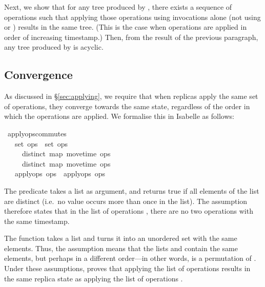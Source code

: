 \documentclass[sigplan,anonymous]{acmart}
\renewenvironment{isabelle}{%
  \medbreak\noindent%
  \renewcommand{\isanewline}{\\}%
  \begin{minipage}{\columnwidth}%
  \begin{isabellebody}%
  \begin{tabbing}%
}{%
  \end{tabbing}%
  \end{isabellebody}%
  \end{minipage}%
  \medbreak%
}
\renewcommand{\isacartoucheopen}{}
\renewcommand{\isacartoucheclose}{}
\begin{document}
Next, we show that for any tree produced by , there exists a sequence of operations such that applying those operations using  invocations alone (not using  or ) results in the same tree.
(This is the case when operations are applied in order of increasing timestamp.)
Then, from the result of the previous paragraph, any tree produced by  is acyclic.

\subsection{Convergence}\label{sec:convergence}

As discussed in \S\ref{sec:applying}, we require that when replicas apply the same set of operations, they converge towards the same state, regardless of the order in which the operations are applied.
We formalise this in Isabelle as follows:
\begin{isabelle}
\isamarkupfalse%
\ apply{\isacharunderscore}ops{\isacharunderscore}commutes{\isacharcolon}\isanewline
\ \ \ {\isacartoucheopen}set\ ops{}\ {\isacharequal}\ set\ ops{}{\isacartoucheclose}\isanewline
\ \ \ \ \ {\isacartoucheopen}distinct\ {\isacharparenleft}map\ move{\isacharunderscore}time\ ops{}{\isacharparenright}{\isacartoucheclose}\isanewline
\ \ \ \ \ {\isacartoucheopen}distinct\ {\isacharparenleft}map\ move{\isacharunderscore}time\ ops{}{\isacharparenright}{\isacartoucheclose}\isanewline
\ \ \ {\isacartoucheopen}apply{\isacharunderscore}ops\ ops{}\ {\isacharequal}\ apply{\isacharunderscore}ops\ ops{}{\isacartoucheclose}
\end{isabelle}

The predicate  takes a list as argument, and returns true if all elements of the list are distinct (i.e.\ no value occurs more than once in the list).
The assumption  therefore states that in the list of operations , there are no two operations with the same timestamp.

The function  takes a list and turns it into an unordered set with the same elements.
Thus, the assumption  means that the lists  and  contain the same elements, but perhaps in a different order---in other words,  is a permutation of .
Under these assumptions,  proves that applying the list of operations  results in the same replica state as applying the list of operations .
\end{document}
